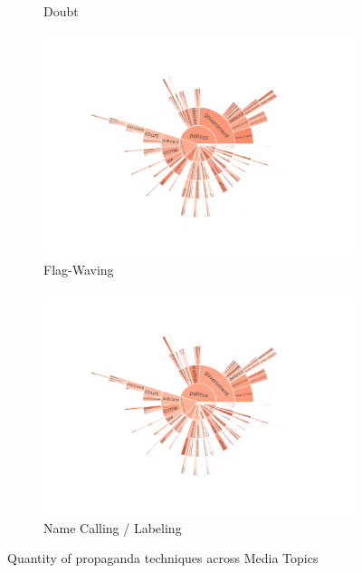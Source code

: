 \begin{figure}[!htbp]
\begin{subfigure}{0.45\textwidth}
		\caption{Doubt}
            \label{fig:baly_iptc_weighted_prop_tech_Doubt}
	\end{subfigure}
	\begin{subfigure}{0.45\textwidth}
		\includegraphics[trim={2.2cm 2cm 2.2cm 2cm},clip,width=\linewidth]{figures/baly_iptc_weighted_prop_tech_Flag-Waving.pdf}
		\caption{Flag-Waving}
            \label{fig:baly_iptc_weighted_prop_tech_Flag-Waving}
	\end{subfigure}
	\begin{subfigure}{0.45\textwidth}
		\includegraphics[trim={2.2cm 2cm 2.2cm 2cm},clip,width=\linewidth]{figures/baly_iptc_weighted_prop_tech_Name_Calling-Labeling.pdf}
		\caption{Name Calling / Labeling}
            \label{fig:baly_iptc_weighted_prop_tech_Name_Calling-Labeling}
	\end{subfigure}
	
    \caption{Quantity of propaganda techniques across Media Topics}
    \label{fig:baly_iptc_weighted_prop_tech}
\end{figure}


